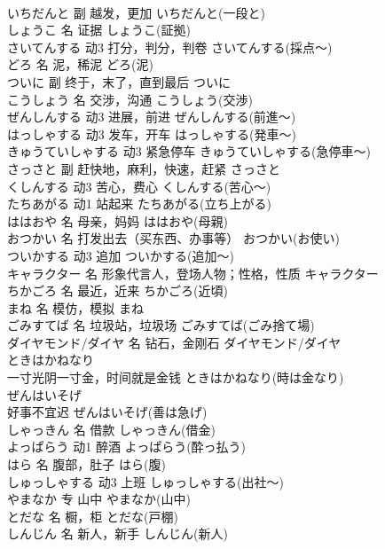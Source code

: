 \documentclass[8pt]{extreport}
\begin{document}
\begin{CJK}{UTF8}{min}
\\	いちだんと	副	越发，更加	いちだんと(一段と)	
\\	しょうこ	名	证据	しょうこ(証拠)	
\\	さいてんする	动3	打分，判分，判卷	さいてんする(採点～)	
\\	どろ	名	泥，稀泥	どろ(泥)	
\\	ついに	副	终于，末了，直到最后	ついに	
\\	こうしょう	名	交涉，沟通	こうしょう(交渉)	
\\	ぜんしんする	动3	进展，前进	ぜんしんする(前進～)	
\\	はっしゃする	动3	发车，开车	はっしゃする(発車～)	
\\	きゅうていしゃする	动3	紧急停车	きゅうていしゃする(急停車～)	
\\	さっさと	副	赶快地，麻利，快速，赶紧	さっさと	
\\	くしんする	动3	苦心，费心	くしんする(苦心～)	
\\	たちあがる	动1	站起来	たちあがる(立ち上がる)	
\\	ははおや	名	母亲，妈妈	ははおや(母親)	
\\	おつかい	名	打发出去（买东西、办事等）	おつかい(お使い)	
\\	ついかする	动3	追加	ついかする(追加～)	
\\	キャラクター	名	形象代言人，登场人物；性格，性质	キャラクター	
\\	ちかごろ	名	最近，近来	ちかごろ(近頃)	
\\	まね	名	模仿，模拟	まね	
\\	ごみすてば	名	垃圾站，垃圾场	ごみすてば(ごみ捨て場)	
\\	ダイヤモンド/ダイヤ	名	钻石，金刚石	ダイヤモンド/ダイヤ	
\\	ときはかねなり	
\\	一寸光阴一寸金，时间就是金钱	ときはかねなり(時は金なり)	
\\	ぜんはいそげ	
\\	好事不宜迟	ぜんはいそげ(善は急げ)	
\\	しゃっきん	名	借款	しゃっきん(借金)	
\\	よっぱらう	动1	醉酒	よっぱらう(酔っ払う)	
\\	はら	名	腹部，肚子	はら(腹)	
\\	しゅっしゃする	动3	上班	しゅっしゃする(出社～)	
\\	やまなか	专	山中	やまなか(山中)	
\\	とだな	名	橱，柜	とだな(戸棚)	
\\	しんじん	名	新人，新手	しんじん(新人)	

\end{CJK}
\end{document}
